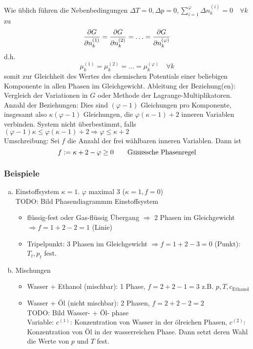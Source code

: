 Wie üblich führen die Nebenbedingungen $\Delta T = 0, \Delta p = 0, \sum_{i=1}^{\varphi} \Delta n_k^{(i)} = 0 \quad \forall k$ zu
\begin{equation}
    \frac{\partial G}{\partial n_k^{(1)}} = \frac{\partial G}{\partial n_k^{(2)}} = \ldots = \frac{\partial G}{\partial n_k^{(\varphi)}}
\end{equation}
d.h.
\begin{equation}
    \mu_k^{(1)} = \mu_k^{(2)} = \ldots = \mu_k^{(\varphi)} \quad \forall k
\end{equation}
somit zur Gleichheit des Wertes des chemischen Potentials einer beliebigen Komponente in allen Phasen im Gleichgewicht. Ableitung der Beziehung(en):
Vergleich der Variationen in $G$ oder Methode der Lagrange-Multiplikatoren. \\
Anzahl der Beziehungen: Dies sind $(\varphi - 1)$ Gleichungen pro Komponente, insgesamt also $\kappa (\varphi - 1)$ Gleichungen, die
$\varphi (\kappa - 1) + 2$ inneren Variablen verbinden. System nicht überbestimmt, falls
$(\varphi - 1) \kappa \leq \varphi (\kappa - 1) + 2 \Rightarrow \varphi \leq \kappa + 2$ \\
Umschreibung: Sei $f$ die Anzahl der frei wählbaren inneren Variablen. Dann ist
\begin{equation}
    f := \kappa + 2 - \varphi \geq 0 \qquad \text{\textsc{Gibbs}sche Phasenregel}
\end{equation}
\subsubsection{Beispiele}
\begin{enumerate}[a)]
    \item Einstoffsystem $\kappa = 1$. $\varphi$ maximal 3 ($\kappa = 1, f = 0$) \\
    TODO: Bild Phasendiagrammm Einstoffsystem  %
    \begin{itemize}
        \item flüssig-fest oder Gas-flüssig Übergang $\Rightarrow$ 2 Phasen im Gleichgewicht $\Rightarrow f = 1 + 2 -2 = 1$ (Linie)
        \item Tripelpunkt: 3 Phasen im Gleichgewicht $\Rightarrow f = 1 + 2 - 3 = 0$ (Punkt): $T_t, p_t$ fest.
    \end{itemize}
    \item Mischungen
    \begin{itemize}
        \item Wasser + Ethanol (mischbar): 1 Phase, $f = 2 + 2 - 1 = 3$ z.B. $p, T, c_\text{Ethanol}$
        \item Wasser + Öl (nicht mischbar): 2 Phasen, $f = 2 + 2 - 2 = 2 $ \\
        TODO: Bild Wasser- + Öl- phase\\  %
        Variable: $c^{(1)}$: Konzentration von Wasser in der ölreichen Phasen, $c^{(2)}$: Konzentration von Öl in der wasserreichen Phase.
        Dann setzt deren Wahl die Werte von $p$ und $T$ fest.
    \end{itemize}
\end{enumerate}

